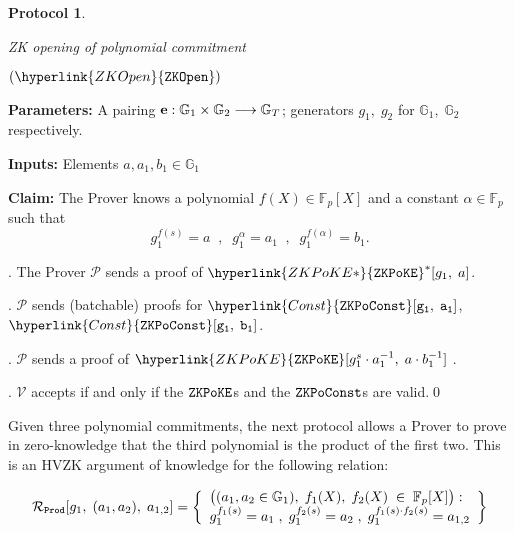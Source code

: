 \documentclass[11pt, lettersize, notitlepage, leqno, footskip=0.6cm]{article}
\newcommand{\bFp}{\mathbb{F}_p}
\newcommand{\lra}{\longrightarrow}
\newcommand{\mc}{\mathcal}
\newcommand{\mb}{\mathbb}
\newcommand{\al}{\alpha}
\newcommand{\mP}{\mc{P}}
\newcommand{\V}{\mc{V}}
\newcommand{\vs}{\vspace{-0.15cm}}
\newcommand{\noin}{\noindent}
\newtheorem{Prot}[Thm]{Protocol}
\numberwithin{equation}{section}
\begin{document}
\bigskip





\begin{mdframed}
\begin{Prot} \hypertarget{ZKOpen}{ZK opening of polynomial commitment} $(\hyperlink{ZKOpen}{\tt{ZKOpen}})$\end{Prot}  

\noin \textbf{Parameters:} A pairing ${\bf{e}}:\mb{G}_1\times \mb{G}_2\lra \mb{G}_T$; generators $g_1,\;g_2$ for $\mb{G}_1,\; \mb{G}_2$ respectively.


\noindent \textbf{Inputs:} Elements $a, a_1, b_1\in \mb{G}_1$

\noin \textbf{Claim:} The Prover knows a polynomial $f(X)\in \bFp[X]$ and a constant $\al\in \bFp$ such that $$g_1^{f(s)} = a\;\;,\;\; g_1^{\al} = a_1\;\;,\;\;g_1^{f(\al)} = b_1. $$

\noin 1. The Prover $\mP$ sends a proof of $\hyperlink{ZKPoKE*}{\tt{ZKPoKE}}^*[g_1,\;a]$.

\noin 2. $\mP$ sends (batchable) proofs for $\hyperlink{Const}{\tt{ZKPoConst}}[g_1,\;a_1]$, $\hyperlink{Const}{\tt{ZKPoConst}}[g_1,\;b_1]$.

\noin 3. $\mP$ sends a proof of $\hyperlink{ZKPoKE}{\tt{ZKPoKE}}[g_1^{s}\cdot a_1^{-1},\;a\cdot b_1^{-1}]$ .

\noin 4. $\V$ accepts if and only if the $\tt{ZKPoKE}$s and the ${\tt{ZKPoConst}}$s are valid.\qed \end{mdframed}


\bigskip

Given three polynomial commitments, the next protocol allows a Prover to prove in zero-knowledge that  the third polynomial is the product of the first two. This is an HVZK argument of knowledge for the following relation:


\vs $$\mc{R}_{\tt{Prod}}[g_1,\;(a_1,a_2),\;a_{1,2}] = \left\{\begin{array}{l} 
\big((a_1,a_2\in\mb{G}_1),\; f_1(X),\;f_2(X)\;\in\; \bFp[X]\big):\\ g_1^{f_1(s)} = a_1\;,\; g_1^{f_2(s)} = a_2\;,\; g_1^{f_1(s)\cdot f_2(s)} = a_{1,2} \end{array}\right\}  $$
\end{document}
